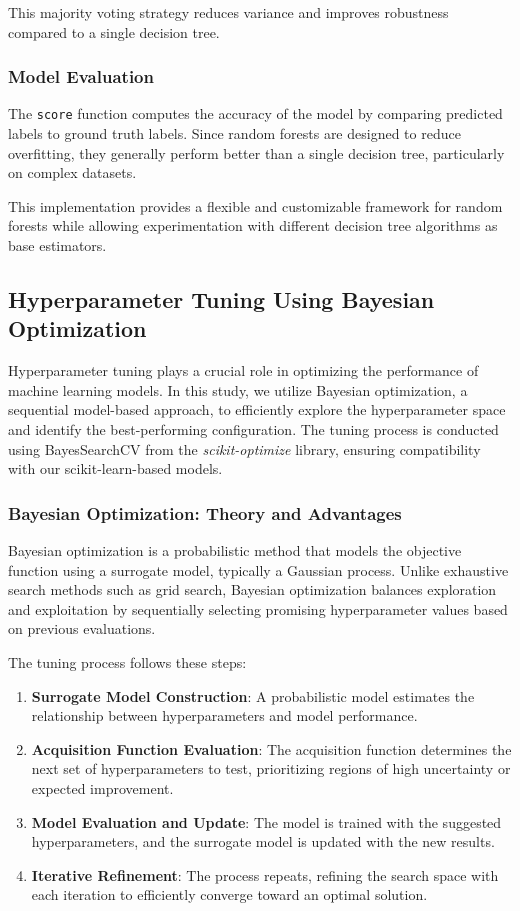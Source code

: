\documentclass[12pt]{article}
\begin{document}
This majority voting strategy reduces variance and improves robustness compared to a single decision tree.

\subsubsection{Model Evaluation}
The \texttt{score} function computes the accuracy of the model by comparing predicted labels to ground truth labels. Since random forests are designed to reduce overfitting, they generally perform better than a single decision tree, particularly on complex datasets.

This implementation provides a flexible and customizable framework for random forests while allowing experimentation with different decision tree algorithms as base estimators.

\subsection{Hyperparameter Tuning Using Bayesian Optimization}

Hyperparameter tuning plays a crucial role in optimizing the performance of machine learning models. In this study, we utilize Bayesian optimization, a sequential model-based approach, to efficiently explore the hyperparameter space and identify the best-performing configuration. The tuning process is conducted using BayesSearchCV from the \textit{scikit-optimize} library, ensuring compatibility with our scikit-learn-based models.

\subsubsection{Bayesian Optimization: Theory and Advantages}

Bayesian optimization is a probabilistic method that models the objective function using a surrogate model, typically a Gaussian process. Unlike exhaustive search methods such as grid search, Bayesian optimization balances exploration and exploitation by sequentially selecting promising hyperparameter values based on previous evaluations.

The tuning process follows these steps:
\begin{enumerate}
    \item \textbf{Surrogate Model Construction}: A probabilistic model estimates the relationship between hyperparameters and model performance.
    \item \textbf{Acquisition Function Evaluation}: The acquisition function determines the next set of hyperparameters to test, prioritizing regions of high uncertainty or expected improvement.
    \item \textbf{Model Evaluation and Update}: The model is trained with the suggested hyperparameters, and the surrogate model is updated with the new results.
    \item \textbf{Iterative Refinement}: The process repeats, refining the search space with each iteration to efficiently converge toward an optimal solution.
\end{enumerate}
\end{document}
